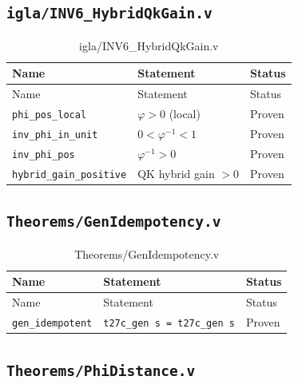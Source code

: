 \subsection{\texttt{igla/INV6\_HybridQkGain.v}}
\label{sec:A-coq-inv6}

\begin{longtable}{lll}
\toprule
Name & Statement & Status \\
\midrule
\endfirsthead
\toprule
Name & Statement & Status \\
\midrule
\endhead
\bottomrule
\endfoot
\bottomrule
\caption{igla/INV6\_HybridQkGain.v}
\endlastfoot
\texttt{phi\_pos\_local} & $\varphi>0$ (local) & Proven \\
\texttt{inv\_phi\_in\_unit} & $0<\varphi^{-1}<1$ & Proven \\
\texttt{inv\_phi\_pos} & $\varphi^{-1}>0$ & Proven \\
\texttt{hybrid\_gain\_positive} & QK hybrid gain $>0$ & Proven \\
\end{longtable}

\subsection{\texttt{Theorems/GenIdempotency.v}}
\label{sec:A-coq-gen}

\begin{longtable}{lll}
\toprule
Name & Statement & Status \\
\midrule
\endfirsthead
\toprule
Name & Statement & Status \\
\midrule
\endhead
\bottomrule
\endfoot
\bottomrule
\caption{Theorems/GenIdempotency.v}
\endlastfoot
\texttt{gen\_idempotent} &
  \texttt{t27c\_gen s = t27c\_gen s} & Proven \\
\end{longtable}

\subsection{\texttt{Theorems/PhiDistance.v}}
\label{sec:A-coq-phidist}

